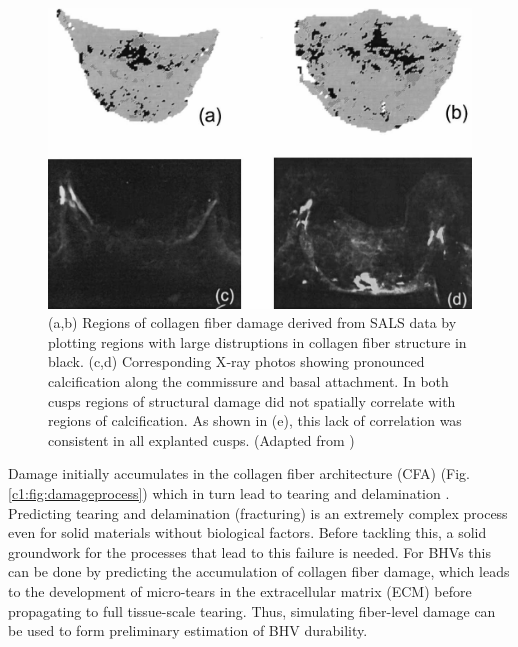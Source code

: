 \begin{figure}
\centering
\includegraphics[width=5.0in]{Images/chapter1/calcificationdamage.jpg}
\caption{(a,b) Regions of collagen fiber damage derived from SALS data by plotting regions with large distruptions in collagen fiber structure in black. (c,d) Corresponding X‐ray photos showing pronounced calcification along the commissure and basal attachment. In both cusps regions of structural damage did not spatially correlate with regions of calcification. As shown in (e), this lack of correlation was consistent in all explanted cusps. (Adapted from \cite{sacks_collagen_2002})}
\label{c1:fig:calcificationdamage}
\end{figure}



    Damage initially accumulates in the collagen fiber architecture (CFA) (Fig. \ref{c1:fig:damageprocess}) which in turn lead to tearing and delamination \cite{vyavahare_mechanisms_1999}. Predicting tearing and delamination (fracturing) is an extremely complex process even for solid materials without biological factors. Before tackling this, a solid groundwork for the processes that lead to this failure is needed. For BHVs this can be done by predicting the accumulation of collagen fiber damage, which leads to the development of micro-tears in the extracellular matrix (ECM) before propagating to full tissue-scale tearing. Thus, simulating fiber-level damage can be used to form preliminary estimation of BHV durability. 

